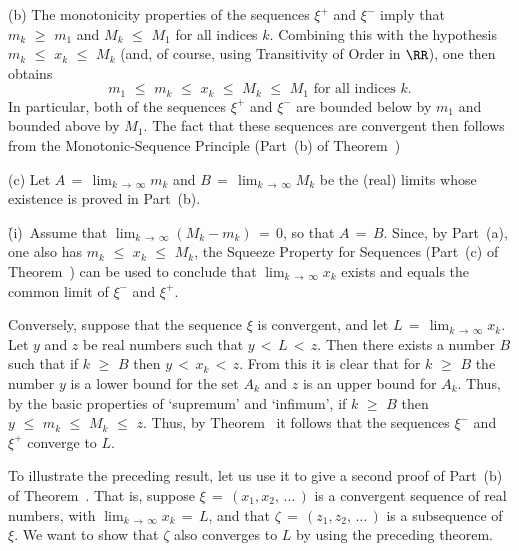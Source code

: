 \V

        (b) The monotonicity properties of the sequences ${\xi}^{+}$ and ${\xi}^{-}$ imply that $m_{k}\,\,{\geq}\,\,m_{1}$ and $M_{k}\,\,{\leq}\,\,M_{1}$ for all indices $k$.
    Combining this with the hypothesis $m_{k}\,\,{\leq}\,\,x_{k}\,\,{\leq}\,\,M_{k}$ (and, of course, using Transitivity of Order in ${\RR}$), one then obtains
        \begin{displaymath}
        m_{1}\,\,{\leq}\,\,m_{k}\,\,{\leq}\,\,x_{k}\,\,{\leq}\,\,M_{k}\,\,{\leq}\,\,M_{1} \mbox{ for all indices $k$}.
        \end{displaymath}
    In particular, both of the sequences ${\xi}^{+}$ and ${\xi}^{-}$ are bounded below by $m_{1}$ and bounded above by $M_{1}$.
    The fact that these sequences are convergent then follows from the Monotonic-Sequence Principle (Part~(b) of Theorem~)

\V

        (c) Let $A \,=\, \lim_{k \,{\rightarrow}\, {\infty}} m_{k}$ and $B \,=\, \lim_{k \,{\rightarrow}\, {\infty}} M_{k}$ be the (real) limits whose existence is proved in Part~(b).

    \h (i)\, Assume that $\lim_{k \,{\rightarrow}\, {\infty}} (M_{k}-m_{k}) \,=\, 0$, so that $A \,=\, B$. Since, by Part~(a), one also has $m_{k}\,\,{\leq}\,\,x_{k}\,\,{\leq}\,\,M_{k}$, 
    the Squeeze Property for Sequences (Part~(c) of Theorem~) can be used to conclude that $\lim_{k \,{\rightarrow}\, {\infty}} x_{k}$ exists and equals the common limit of ${\xi}^{-}$ and ${\xi}^{+}$.

        Conversely, suppose that the sequence ${\xi}$ is convergent, and let $L \,=\, \lim_{k \,{\rightarrow}\, {\infty}} x_{k}$.
    Let $y$ and $z$ be real numbers such that $y\,<\,L\,<\,z$.
    Then there exists a number $B$ such that if $k\,\,{\geq}\,\,B$ then $y\,<\,x_{k}\,<\,z$.
    From this it is clear that for $k\,\,{\geq}\,\,B$ the number $y$ is a lower bound for the set $A_{k}$ and $z$ is an upper bound for $A_{k}$.
    Thus, by the basic properties of `supremum' and `infimum', if $k\,\,{\geq}\,\,B$ then 
    $y\,\,{\leq}\,\,m_{k}\,\,{\leq}\,\,M_{k}\,\,{\leq}\,\,z$.
    Thus, by Theorem~ it follows that the sequences ${\xi}^{-}$ and ${\xi}^{+}$ converge to $L$.

\V
\V

        To illustrate the preceding result, let us use it to give a second proof of Part~(b) of Theorem~.
    That is, suppose ${\xi} \,=\, (x_{1},x_{2},\,{\ldots}\,)$ is a convergent sequence of real numbers, with $\lim_{k \,{\rightarrow}\, {\infty}} x_{k} \,=\, L$,
    and that ${\zeta} \,=\, (z_{1},z_{2},\,{\ldots}\,)$ is a subsequence of ${\xi}$.
     We want to show that ${\zeta}$ also converges to $L$ by using the preceding theorem.

